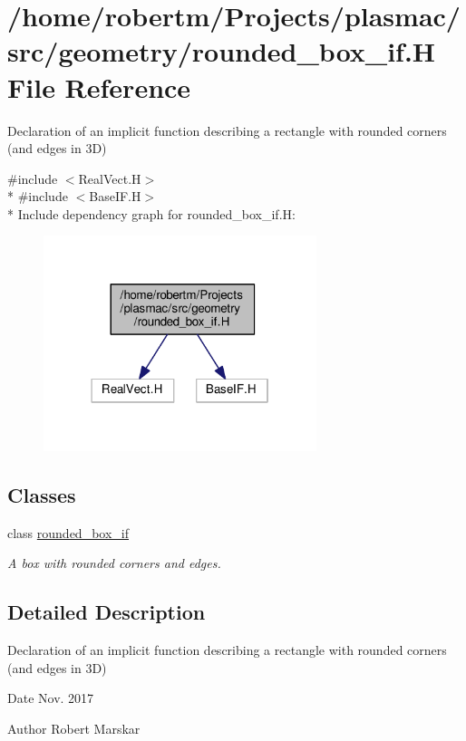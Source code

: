 \hypertarget{rounded__box__if_8H}{}\section{/home/robertm/\+Projects/plasmac/src/geometry/rounded\+\_\+box\+\_\+if.H File Reference}
\label{rounded__box__if_8H}


Declaration of an implicit function describing a rectangle with rounded corners (and edges in 3D)  


{\ttfamily \#include $<$Real\+Vect.\+H$>$}\\*
{\ttfamily \#include $<$Base\+I\+F.\+H$>$}\\*
Include dependency graph for rounded\+\_\+box\+\_\+if.\+H\+:\nopagebreak
\begin{figure}[H]
\begin{center}
\leavevmode
\includegraphics[width=226pt]{rounded__box__if_8H__incl}
\end{center}
\end{figure}
\subsection*{Classes}
\begin{DoxyCompactItemize}
\item 
class \hyperlink{classrounded__box__if}{rounded\+\_\+box\+\_\+if}
\begin{DoxyCompactList}\small\item\em A box with rounded corners and edges. \end{DoxyCompactList}\end{DoxyCompactItemize}


\subsection{Detailed Description}
Declaration of an implicit function describing a rectangle with rounded corners (and edges in 3D) 

\begin{DoxyDate}{Date}
Nov. 2017 
\end{DoxyDate}
\begin{DoxyAuthor}{Author}
Robert Marskar 
\end{DoxyAuthor}
